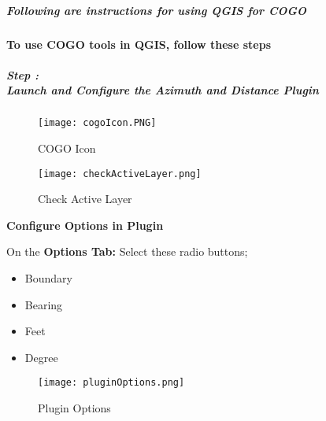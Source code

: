 \subparagraph{Following are instructions for using QGIS for COGO}

\clearpage
\paragraph{To use COGO tools in QGIS, follow these steps}
\vspace{.2in}


\subparagraph*{{\LARGE Step \thestepCount:}\\Launch and Configure the Azimuth and Distance Plugin}

\begin{figure}[H]
\centering
     \texttt{[image: cogoIcon.PNG]}
\vspace{-.2in}

\caption{COGO Icon}
\end{figure}

\vspace{.1in}


\begin{figure}[H] %
\centering
    \texttt{[image: checkActiveLayer.png]}
\vspace{-.3in}

\caption{Check Active Layer}
\end{figure}
\clearpage
\noindent\textbf{Configure Options in Plugin}
\vspace{.2in}

\large On the \textbf{Options Tab:} Select these radio buttons;
\begin{itemize}
\item Boundary
\item Bearing
\item Feet
\item Degree
\end{itemize}
\begin{figure}[H]
\centering
    \texttt{[image: pluginOptions.png]}
\vspace{-.2in}

\caption{Plugin Options}
\end{figure}
\clearpage

